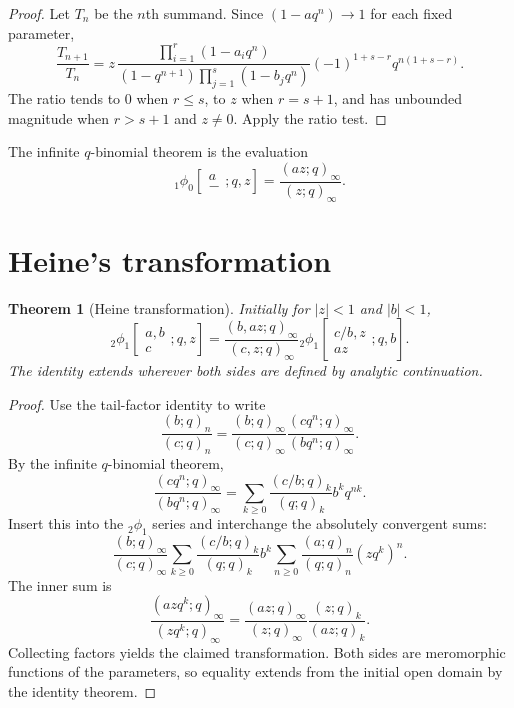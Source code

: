 \documentclass[11pt,oneside,openany]{book}
\newtheorem{theorem}{Theorem}[chapter]
\theoremstyle{definition}
\theoremstyle{remark}
\newcommand{\abs}[1]{\lvert #1\rvert}
\begin{document}
\begin{proof}
Let $T_n$ be the $n$th summand.  Since $(1-aq^n)\to1$ for each fixed parameter,
\[
 \frac{T_{n+1}}{T_n}
 =z\,\frac{\prod_{i=1}^{r}(1-a_iq^n)}
 {(1-q^{n+1})\prod_{j=1}^{s}(1-b_jq^n)}
 (-1)^{1+s-r}q^{n(1+s-r)}.
\]
The ratio tends to $0$ when $r\le s$, to $z$ when $r=s+1$, and has unbounded magnitude when $r>s+1$ and $z\ne0$.  Apply the ratio test.
\end{proof}

The infinite $q$-binomial theorem is the evaluation
\[
 {}_1\phi_0\!\left[\begin{matrix}a\\-\end{matrix};q,z\right]
 =\frac{(az;q)_\infty}{(z;q)_\infty}.
\]

\section{Heine's transformation}

\begin{theorem}[Heine transformation]\label{thm:heine}
Initially for $\abs z<1$ and $\abs b<1$,
\[
 {}_2\phi_1\!\left[\begin{matrix}a,b\\c\end{matrix};q,z\right]
 =\frac{(b,az;q)_\infty}{(c,z;q)_\infty}
 {}_2\phi_1\!\left[\begin{matrix}c/b,z\\az\end{matrix};q,b\right].
\]
The identity extends wherever both sides are defined by analytic continuation.
\end{theorem}

\begin{proof}
Use the tail-factor identity to write
\[
 \frac{(b;q)_n}{(c;q)_n}
 =\frac{(b;q)_\infty}{(c;q)_\infty}
 \frac{(cq^n;q)_\infty}{(bq^n;q)_\infty}.
\]
By the infinite $q$-binomial theorem,
\[
 \frac{(cq^n;q)_\infty}{(bq^n;q)_\infty}
 =\sum_{k\ge0}\frac{(c/b;q)_k}{(q;q)_k}b^kq^{nk}.
\]
Insert this into the ${}_2\phi_1$ series and interchange the absolutely convergent sums:
\[
 \frac{(b;q)_\infty}{(c;q)_\infty}
 \sum_{k\ge0}\frac{(c/b;q)_k}{(q;q)_k}b^k
 \sum_{n\ge0}\frac{(a;q)_n}{(q;q)_n}(zq^k)^n.
\]
The inner sum is
\[
 \frac{(azq^k;q)_\infty}{(zq^k;q)_\infty}
 =\frac{(az;q)_\infty}{(z;q)_\infty}
 \frac{(z;q)_k}{(az;q)_k}.
\]
Collecting factors yields the claimed transformation.  Both sides are meromorphic functions of the parameters, so equality extends from the initial open domain by the identity theorem.
\end{proof}
\end{document}
